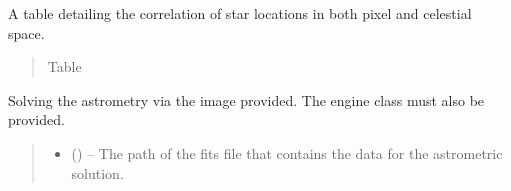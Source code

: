\documentclass[letterpaper,11pt,english]{sphinxmanual}
\begin{document}
\begin{savenotes}
\begin{fulllineitems}
\begin{savenotes}\begin{fulllineitems}
\label{\detokenize{code/opihiexarata.astrometry.solution:opihiexarata.astrometry.solution.AstrometricSolution.star_table}}
\pysigstartsignatures
{}
\pysigstopsignatures
\sphinxAtStartPar
A table detailing the correlation of star locations in both pixel and
celestial space.
\begin{quote}\begin{description}
\sphinxAtStartPar
Table

\end{description}\end{quote}

\end{fulllineitems}\end{savenotes}


\begin{savenotes}\begin{fulllineitems}
\label{\detokenize{code/opihiexarata.astrometry.solution:opihiexarata.astrometry.solution.AstrometricSolution.__init__}}
\pysigstartsignatures
{}
\pysigstopsignatures
\sphinxAtStartPar
Solving the astrometry via the image provided. The engine class must
also be provided.
\begin{quote}\begin{description}
\begin{itemize}
\item {} 
\sphinxAtStartPar
{} () – The path of the fits file that contains the data for the astrometric
solution.


\end{itemize}
\end{description}
\end{quote}
\end{fulllineitems}
\end{savenotes}
\end{fulllineitems}
\end{savenotes}
\end{document}
